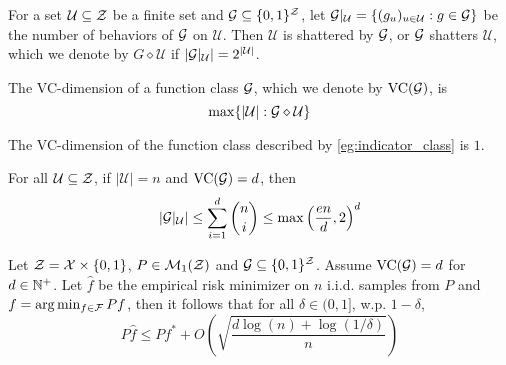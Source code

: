 \documentclass[twoside]{article}
\newcommand{\VC}{\mathrm{VC}}
\newcommand{\cU}{\mathcal{U}}
\begin{document}
\begin{definition}[Shatter]
    For a set $\cU\subseteq \cZ$ be a finite set and $\mathcal{G}\subseteq \{0,1\}^{\mathcal{Z}}$, let $\cG\vert_{\cU}=\{(g_u)_{u\in \cU}:g\in \cG\}$ be the number of behaviors of $\mathcal{G}$ on $\cU$. Then $\cU$ is shattered by $\mathcal{G}$, or $\mathcal{G}$ shatters $\cU$, which we denote by $G\diamond \cU$ if $|\cG\vert_{\cU}|=2^{|\cU|}$.
\end{definition}
\begin{definition}[VC-dimension]
    The VC-dimension of a function class $\mathcal{G}$, which we denote by $\VC(\cG)$, is
    \[\max \{|\cU|:\cG\diamond \cU\} \]
\end{definition}
The VC-dimension of the function class described by \cref{eg:indicator_class} is $1$.
\begin{lemma}
    For all $\cU\subseteq \cZ$, if $|\cU|=n$ and $\VC(\cG)=d$, then 
    \[|\cG\vert_{\cU}|\le \sum_{i=1}^d {n\choose i} \le \max\left(\frac{en}{d},2\right)^d\]
 \end{lemma}
 \begin{corollary}\label{cor:oracle_ineq_VC}
    Let $\mathcal{Z}=\mathcal{X}\times \{0,1\}$, $P\in \mathcal{M}_1(\mathcal{Z})$ and $\mathcal{G}\subseteq \{0,1\}^{\mathcal{Z}}$. Assume $\VC(\cG)=d$ for $d\in \mathbb{N}^+$. Let $\hat f$ be the empirical risk minimizer on $n$ i.i.d. samples from $P$ and $f=\arg\min_{f\in \mathcal{F}} Pf$, then it follows that for all $\delta\in (0,1]$, w.p. $1-\delta$,
    \begin{equation*}
        P\hat f \le Pf^*+O\left(\sqrt{\frac{d\log(n)+\log(1/\delta)}{n}}\right)
    \end{equation*}
 \end{corollary}
\end{document}
